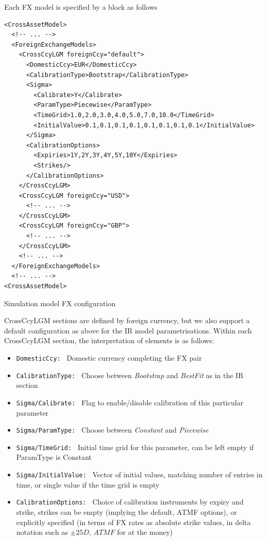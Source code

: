 \documentclass[12pt, a4paper]{article}
\begin{document}
{{\medskip

Each FX model is specified by a block as follows

\begin{listing}[H]
\begin{verbatim}
<CrossAssetModel>	
  <!-- ... -->
  <ForeignExchangeModels>
    <CrossCcyLGM foreignCcy="default">
      <DomesticCcy>EUR</DomesticCcy>
      <CalibrationType>Bootstrap</CalibrationType>
      <Sigma>
        <Calibrate>Y</Calibrate>
        <ParamType>Piecewise</ParamType>
        <TimeGrid>1.0,2.0,3.0,4.0,5.0,7.0,10.0</TimeGrid>
        <InitialValue>0.1,0.1,0.1,0.1,0.1,0.1,0.1,0.1</InitialValue>
      </Sigma>
      <CalibrationOptions>
        <Expiries>1Y,2Y,3Y,4Y,5Y,10Y</Expiries>
        <Strikes/>
      </CalibrationOptions>
    </CrossCcyLGM>
    <CrossCcyLGM foreignCcy="USD">
      <!-- ... -->
    </CrossCcyLGM>
    <CrossCcyLGM foreignCcy="GBP">
      <!-- ... -->
    </CrossCcyLGM>
    <!-- ... -->
  </ForeignExchangeModels>
  <!-- ... -->
<CrossAssetModel>	
\end{verbatim}
\caption{Simulation model FX configuration}
\label{lst:simulation_model_fx_configuration}
\end{listing}

CrossCcyLGM sections are defined by foreign currency, but we also support a default configuration as above for the IR
model parametrisations.  Within each CrossCcyLGM section, the interpretation of elements is as follows:

\begin{itemize}
\item {\tt DomesticCcy: } Domestic currency completing the FX pair
\item {\tt CalibrationType: } Choose between {\em Bootstrap} and {\em BestFit} as in the IR section
\item {\tt Sigma/Calibrate: } Flag to enable/disable calibration of this particular parameter
\item {\tt Sigma/ParamType: } Choose between {\em Constant} and {\em Piecewise}
\item {\tt Sigma/TimeGrid: } Initial time grid for this parameter, can be left empty if ParamType is Constant
\item {\tt Sigma/InitialValue: } Vector of initial values, matching number of entries in time, or single value if the
time grid is empty
\item {\tt CalibrationOptions: } Choice of calibration instruments by expiry and strike, strikes can be empty (implying
the default, ATMF options), or explicitly specified (in terms of FX rates as absolute strike values, in delta notation
such as $\pm 25D$, $ATMF$ for at the money)
\end{itemize}


}}
\end{document}
